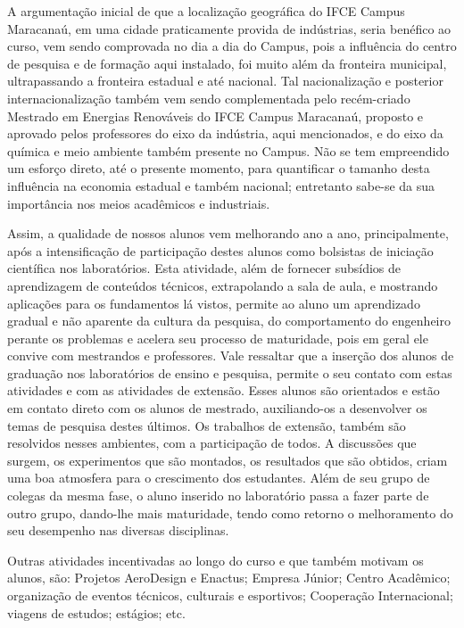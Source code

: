A argumentação inicial de que a localização geográfica do IFCE Campus Maracanaú, em uma cidade praticamente provida de indústrias, seria benéfico ao curso, vem sendo comprovada no dia a dia do Campus, pois a influência do centro de pesquisa e de formação aqui instalado, foi muito além da fronteira municipal, ultrapassando a fronteira estadual e até nacional. Tal nacionalização e posterior internacionalização também vem sendo complementada pelo recém-criado Mestrado em Energias Renováveis do IFCE Campus Maracanaú, proposto e aprovado pelos professores do eixo da indústria, aqui mencionados, e do eixo da química e meio ambiente também presente no Campus. Não se tem empreendido um esforço direto, até o presente momento, para quantificar o tamanho desta influência na economia estadual e também nacional; entretanto sabe-se da sua importância nos meios acadêmicos e industriais. 

Assim, a qualidade de nossos alunos vem melhorando ano a ano, principalmente, após a intensificação de participação destes alunos como bolsistas de iniciação científica nos laboratórios. Esta atividade, além de fornecer subsídios de aprendizagem de conteúdos técnicos, extrapolando a sala de aula, e mostrando aplicações para os fundamentos lá vistos, permite ao aluno um aprendizado gradual e não aparente da cultura da pesquisa, do comportamento do engenheiro perante os problemas e acelera seu processo de maturidade, pois em geral ele convive com mestrandos e professores. Vale ressaltar que a inserção dos alunos de graduação nos laboratórios de ensino e pesquisa, permite o seu contato com estas atividades e com as atividades de extensão. Esses alunos são orientados e estão em contato direto com os alunos de mestrado, auxiliando-os a desenvolver os temas de pesquisa destes últimos. Os trabalhos de extensão, também são resolvidos nesses ambientes, com a participação de todos. A discussões que surgem, os experimentos que são montados, os resultados que são obtidos, criam uma boa atmosfera para o crescimento dos estudantes. Além de seu grupo de colegas da mesma fase, o aluno inserido no laboratório passa a fazer parte de outro grupo, dando-lhe mais maturidade, tendo como retorno o melhoramento do seu desempenho nas diversas disciplinas.

Outras atividades incentivadas ao longo do curso e que também motivam os alunos, são: Projetos AeroDesign e Enactus; Empresa Júnior; Centro Acadêmico; organização de eventos técnicos, culturais e esportivos; Cooperação Internacional; viagens de estudos; estágios; etc.

